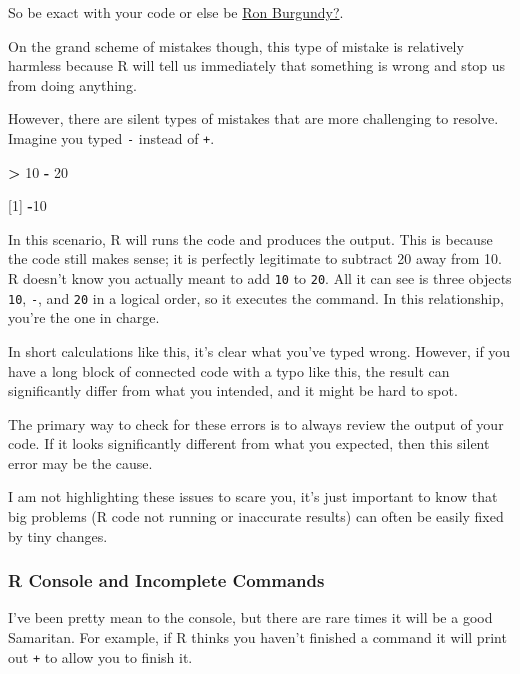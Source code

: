 \documentclass[
]{book}
\newenvironment{Shaded}{\begin{snugshade}}{\end{snugshade}}
\newcommand{\DecValTok}[1]{\textcolor[rgb]{0.00,0.00,0.81}{#1}}
\newcommand{\NormalTok}[1]{#1}
\newcommand{\SpecialCharTok}[1]{\textcolor[rgb]{0.81,0.36,0.00}{\textbf{#1}}}
\begin{document}
So be exact with your code or else be \href{https://www.youtube.com/watch?v=X3zfP14pLxc}{Ron Burgundy?}.

On the grand scheme of mistakes though, this type of mistake is relatively harmless because R will tell us immediately that something is wrong and stop us from doing anything.

However, there are silent types of mistakes that are more challenging to resolve. Imagine you typed \texttt{-} instead of \texttt{+}.

\begin{Shaded}
\begin{Highlighting}[]
\SpecialCharTok{\textgreater{}} \DecValTok{10} \SpecialCharTok{{-}} \DecValTok{20}

\NormalTok{[}\DecValTok{1}\NormalTok{] }\SpecialCharTok{{-}}\DecValTok{10}
\end{Highlighting}
\end{Shaded}

In this scenario, R will runs the code and produces the output. This is because the code still makes sense; it is perfectly legitimate to subtract 20 away from 10. R doesn't know you actually meant to add \texttt{10} to \texttt{20}. All it can see is three objects \texttt{10}, \texttt{-}, and \texttt{20} in a logical order, so it executes the command. In this relationship, you're the one in charge.

In short calculations like this, it's clear what you've typed wrong. However, if you have a long block of connected code with a typo like this, the result can significantly differ from what you intended, and it might be hard to spot.

The primary way to check for these errors is to always review the output of your code. If it looks significantly different from what you expected, then this silent error may be the cause.

I am not highlighting these issues to scare you, it's just important to know that big problems (R code not running or inaccurate results) can often be easily fixed by tiny changes.

\hypertarget{r-console-and-incomplete-commands}{%
\subsubsection{R Console and Incomplete Commands}\label{r-console-and-incomplete-commands}}

I've been pretty mean to the console, but there are rare times it will be a good Samaritan. For example, if R thinks you haven't finished a command it will print out \texttt{+} to allow you to finish it.
\end{document}
